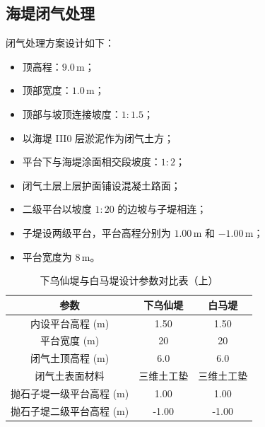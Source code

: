 \documentclass[UTF8, a4paper, 12pt]{ctexart} %
\begin{document}
\subsection{海堤闭气处理}

闭气处理方案设计如下：
\begin{itemize}
    \item 顶高程：$9.0\,\text{m}$；
    \item 顶部宽度：$1.0\,\text{m}$；
    \item 顶部与坡顶连接坡度：$1:1.5$；
    \item 以海堤 III0 层淤泥作为闭气土方；
    \item 平台下与海堤涂面相交段坡度：$1:2$；
    \item 闭气土层上层护面铺设混凝土路面；
    \item 二级平台以坡度 $1:20$ 的边坡与子堤相连；
    \item 子堤设两级平台，平台高程分别为 $1.00\,\text{m}$ 和 $-1.00\,\text{m}$；
    \item 平台宽度为 $8\,\text{m}$。
\end{itemize}



\begin{table}[h]
    \centering
    \caption{下乌仙堤与白马堤设计参数对比表（上）}
    \begin{tabular}{|c|c|c|}
        \hline
        \textbf{参数} & \textbf{下乌仙堤} & \textbf{白马堤} \\ \hline
        内设平台高程 (m) & 1.50 & 1.50 \\ \hline
        平台宽度 (m) & 20 & 20 \\ \hline
        闭气土顶高程 (m) & 6.0 & 6.0 \\ \hline
        闭气土表面材料 & 三维土工垫 & 三维土工垫 \\ \hline
        抛石子堤一级平台高程 (m) & 1.00 & 1.00 \\ \hline
        抛石子堤二级平台高程 (m) & -1.00 & -1.00 \\ \hline
    \end{tabular}
    \label{tab:west_south_dike_comparison_part1}
\end{table}
\end{document}
